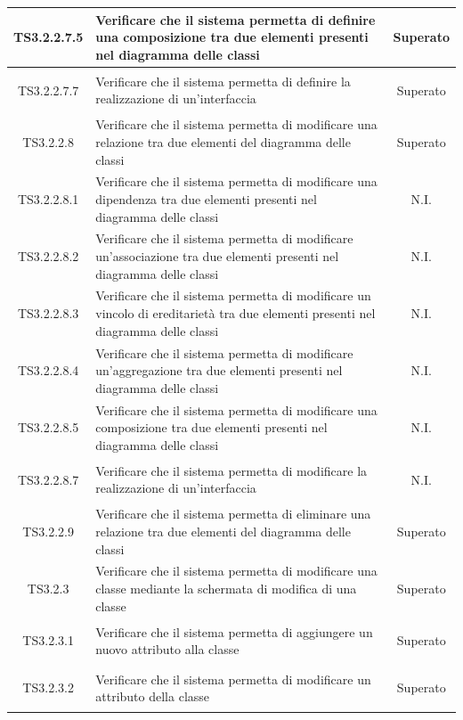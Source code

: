 \documentclass[../PianoDiQualifica.tex]{subfiles}
\begin{document}
\begin{longtable}{|c|>{\centering}p{10cm}|c|}
	\hypertarget{TS3.2.2.7.5}{TS3.2.2.7.5} & Verificare che il sistema permetta di definire una composizione tra due elementi presenti nel diagramma delle classi & Superato \\
	\hline
	\hypertarget{TS3.2.2.7.7}{TS3.2.2.7.7} & Verificare che il sistema permetta di definire la realizzazione di un'interfaccia & Superato \\
	\hline
	\hypertarget{TS3.2.2.8}{TS3.2.2.8} & Verificare che il sistema permetta di modificare una relazione tra due elementi del diagramma delle classi & Superato \\
	\hline
	\hypertarget{TS3.2.2.8.1}{TS3.2.2.8.1} & Verificare che il sistema permetta di modificare una dipendenza tra due elementi presenti nel diagramma delle classi & N.I. \\
	\hline
	\hypertarget{TS3.2.2.8.2}{TS3.2.2.8.2} & Verificare che il sistema permetta di modificare un'associazione tra due elementi presenti nel diagramma delle classi & N.I. \\
	\hline
	\hypertarget{TS3.2.2.8.3}{TS3.2.2.8.3} & Verificare che il sistema permetta di modificare un vincolo di ereditarietà tra due elementi presenti nel diagramma delle classi & N.I. \\
	\hline
	\hypertarget{TS3.2.2.8.4}{TS3.2.2.8.4} & Verificare che il sistema permetta di modificare un'aggregazione tra due elementi presenti nel diagramma delle classi & N.I. \\
	\hline
	\hypertarget{TS3.2.2.8.5}{TS3.2.2.8.5} & Verificare che il sistema permetta di modificare una composizione tra due elementi presenti nel diagramma delle classi & N.I. \\
	\hline
	\hypertarget{TS3.2.2.8.7}{TS3.2.2.8.7} & Verificare che il sistema permetta di modificare la realizzazione di un'interfaccia & N.I. \\
	\hline
	\hypertarget{TS3.2.2.9}{TS3.2.2.9} & Verificare che il sistema permetta di eliminare una relazione tra due elementi del diagramma delle classi & Superato \\
	\hline
	\hypertarget{TS3.2.3}{TS3.2.3} & Verificare che il sistema permetta di modificare una classe mediante la schermata di modifica di una classe & Superato\\
	\hline
	\hypertarget{TS3.2.3.1}{TS3.2.3.1} & Verificare che il sistema permetta di aggiungere un nuovo attributo alla classe & Superato \\
	\hline
	\hypertarget{TS3.2.3.2}{TS3.2.3.2} & Verificare che il sistema permetta di modificare un attributo della classe & Superato \\

\end{longtable}
\end{document}
